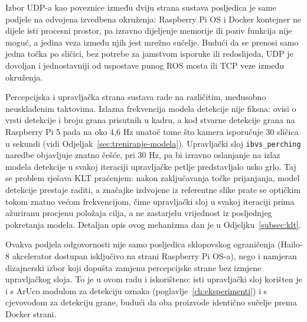 Izbor UDP-a kao poveznice između dviju strana sustava posljedica je same podjele na odvojena izvedbena okruženja: Raspberry Pi OS i Docker kontejner ne dijele isti procesni prostor, pa izravno dijeljenje memorije ili poziv funkcija nije moguć, a jedina veza između njih jest mrežno sučelje. Budući da se prenosi samo jedna točka po sličici, bez potrebe za jamstvom isporuke ili redoslijeda, UDP je dovoljan i jednostavniji od uspostave punog ROS mosta ili TCP veze između okruženja.

Percepcijska i upravljačka strana sustava rade na različitim, međusobno neusklađenim taktovima. Izlazna frekvencija modela detekcije nije fiksna: ovisi o vrsti detekcije i broju grana prisutnih u kadru, a kod stvarne detekcije grana na Raspberry Pi 5 pada na oko 4,6 Hz unatoč tome što kamera isporučuje 30 sličica u sekundi (vidi Odjeljak~\ref{sec:treniranje-modela}). Upravljački sloj \texttt{ibvs\_perching} naredbe objavljuje znatno češće, pri 30 Hz, pa bi izravno oslanjanje na izlaz modela detekcije u svakoj iteraciji upravljačke petlje predstavljalo usko grlo. Taj se problem rješava KLT praćenjem: nakon zaključavanja točke prijanjanja, model detekcije prestaje raditi, a značajke izdvojene iz referentne slike prate se optičkim tokom znatno većom frekvencijom, čime upravljački sloj u svakoj iteraciji prima ažuriranu procjenu položaja cilja, a ne zastarjelu vrijednost iz posljednjeg pokretanja modela. Detaljan opis ovog mehanizma dan je u Odjeljku~\ref{subsec:klt}.

Ovakva podjela odgovornosti nije samo posljedica sklopovskog ograničenja (Hailo-8 akcelerator dostupan isključivo na strani Raspberry Pi OS-a), nego i namjeran dizajnerski izbor koji dopušta zamjenu percepcijske strane bez izmjene upravljačkog sloja. To je u ovom radu i iskorišteno: isti upravljački sloj korišten je i s ArUco modulom za detekciju oznaka (poglavlje~\ref{ch:eksperimenti}) i s cjevovodom za detekciju grane, budući da oba proizvode identično sučelje prema Docker strani.
